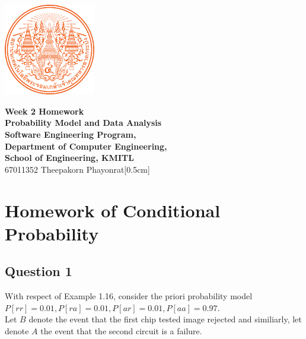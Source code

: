 \documentclass[12pt]{report} %
\begin{document}
\begin{titlepage}
	\centering
	\vspace*{1cm} %
	\includegraphics[width=0.3\textwidth]{../images/KMITL Logo.png} %

	\vspace{1cm} %
	{\LARGE \textbf{Week 2 Homework}} \\[0.5cm] %
	\vspace{0.5cm}
	{\large \textbf{Probability Model and Data Analysis}} \\[0.5cm]
    {\large \textbf{Software Engineering Program,}} \\[0.5cm]
	{\large \textbf{Department of Computer Engineering,}} \\[0.5cm]
	{\large \textbf{School of Engineering, KMITL}} \\[1cm]
	{\Large 67011352 Theepakorn Phayonrat}[0.5cm] %
\end{titlepage}

\section*{Homework of Conditional Probability}

\subsection*{Question 1}

With respect of Example 1.16, consider the priori probability model\\

\noindent $P[rr] = 0.01, P[ra] = 0.01, P[ar] = 0.01, P[aa] = 0.97$.\\

\noindent Let $B$ denote the event that the first chip tested image
rejected and similiarly, let denote $A$ the event that the second
circuit is a failure.\\
\end{document}
